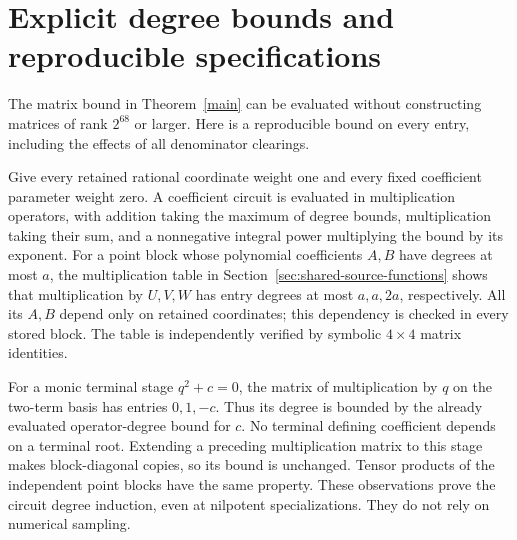 \documentclass[11pt]{article}
\begin{document}
\section{Explicit degree bounds and reproducible specifications}
\label{sec:joint-degree}
The matrix bound in Theorem~\ref{main} can be evaluated without constructing
matrices of rank $2^{68}$ or larger. Here is a reproducible bound on every
entry, including the effects of all denominator clearings.

Give every retained rational coordinate weight one and every fixed
coefficient parameter weight zero. A coefficient circuit is evaluated in
multiplication operators, with addition taking the maximum of degree bounds,
multiplication taking their sum, and a nonnegative integral power multiplying
the bound by its exponent. For a point block whose polynomial coefficients
$A,B$ have degrees at most $a$, the multiplication table in
Section~\ref{sec:shared-source-functions} shows that multiplication by
$U,V,W$ has entry degrees at most $a,a,2a$, respectively. All its $A,B$
depend only on retained coordinates; this dependency is checked in every
stored block. The table is independently verified by symbolic $4\times4$
matrix identities.

For a monic terminal stage $q^2+c=0$, the matrix of multiplication by $q$
on the two-term basis has entries $0,1,-c$. Thus its degree is bounded by
the already evaluated operator-degree bound for $c$. No terminal defining
coefficient depends on a terminal root. Extending a preceding multiplication
matrix to this stage makes block-diagonal copies, so its bound is unchanged.
Tensor products of the independent point blocks have the same property.
These observations prove the circuit degree induction, even at nilpotent
specializations. They do not rely on numerical sampling.
\end{document}
